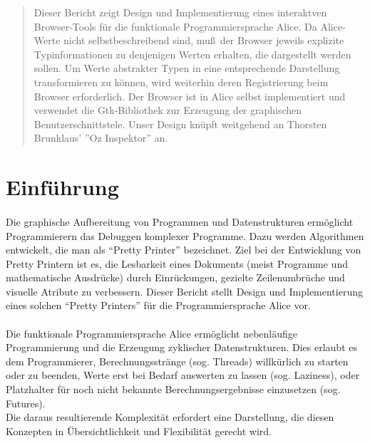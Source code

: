\documentclass[12pt,a4paper]{article}
\begin{document}
\begin{abstract}
Dieser Bericht zeigt Design und Implementierung eines 
interaktven Browser-Tools f\"{u}r die funktionale Programmiersprache 
Alice. Da Alice-Werte nicht selbstbeschreibend sind, 
mu\ss \, der Browser jeweils explizite Typinformationen zu denjenigen  
Werten erhalten, die dargestellt werden sollen. 
Um Werte abstrakter Typen in eine entsprechende Darstellung 
transformieren zu k\"{o}nnen, wird weiterhin 
deren Registrierung beim Browser erforderlich. 
Der Browser ist in Alice selbst implementiert und verwendet die Gtk-Bibliothek
zur Erzeugung der graphischen Benutzerschnittstele.
Unser Design kn\"{u}pft weitgehend an Thorsten Brunklaus' ''Oz Inspektor'' 
\cite{br:oz} an.
\end{abstract}



\section{Einf\"{u}hrung}  

\paragraph{}

Die graphische Aufbereitung von Programmen und Datenstrukturen erm\"{o}glicht 
Programmierern das Debuggen komplexer Programme. 
Dazu werden Algorithmen entwickelt, die man als ``Pretty Printer'' bezeichnet. 
Ziel bei der Entwicklung von Pretty Printern ist es, die Lesbarkeit eines 
Dokuments (meist Programme und mathematische Ausdr\"{u}cke) durch 
Einr\"{u}ckungen, gezielte Zeilenumbr\"{u}che und 
visuelle Atribute zu verbessern.
Dieser Bericht stellt Design und Implementierung 
eines solchen ``Pretty Printers'' f\"{u}r die Programmiersprache Alice vor. 

\paragraph{}

Die funktionale Programmiersprache Alice erm\"{o}glicht nebenl\"{a}ufige 
Programmierung und die Erzeugung zyklischer Datenstrukturen. 
Dies erlaubt es dem Programmierer, Berechnungsstr\"{a}nge (sog. Threads) 
willk\"{u}rlich zu starten oder zu beenden, Werte erst bei 
Bedarf auswerten zu lassen (sog. Laziness), oder Platzhalter 
f\"{u}r noch nicht bekannte Berechnungsergebnisse einzusetzen (sog. Futures).
\\
Die daraus resultierende Komplexit\"{a}t erfordert eine Darstellung, 
die diesen Konzepten in \"{U}bersichtlichkeit und Flexibilit\"{a}t gerecht 
wird.
\end{document}
